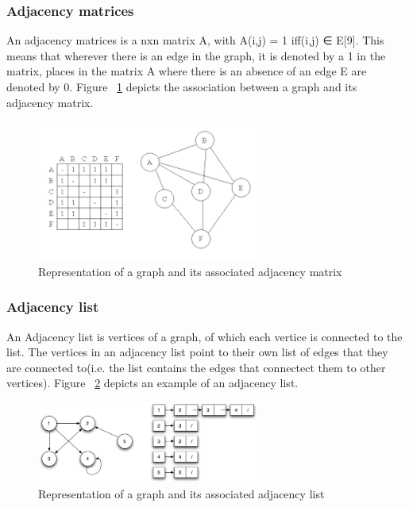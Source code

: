 \subsubsection{Adjacency matrices}
An adjacency matrices is a nxn matrix A, with A(i,j) = 1 iff(i,j) ∈ E[9]. This means that wherever there is an edge in the graph, it is denoted by a 1 in the matrix, places in the matrix A where there is an absence of an edge E are denoted by 0.\newline\newline
Figure ~\ref{fig:adjacencymatrix} depicts the association between a graph and its adjacency matrix.
\begin{figure}[H]
  \begin{center}
      \includegraphics[width=0.65\textwidth]{adjacencymatrix.png}
  \end{center}    
  \caption{Representation of a graph and its associated adjacency matrix}
  \label{fig:adjacencymatrix}
\end{figure}

\subsubsection{Adjacency list}
An Adjacency list is vertices of a graph, of which each vertice is connected to the list. The vertices in an adjacency list point to their own list of edges that they are connected to(i.e. the list contains the edges that connectect them to other vertices).
Figure ~\ref{fig:adjacencylist} depicts an example of an adjacency list.
\begin{figure}[H]
  \begin{center}
      \includegraphics[width=0.65\textwidth]{adjacencylist.png}
  \end{center}    
  \caption{Representation of a graph and its associated adjacency list}
  \label{fig:adjacencylist}
\end{figure}

